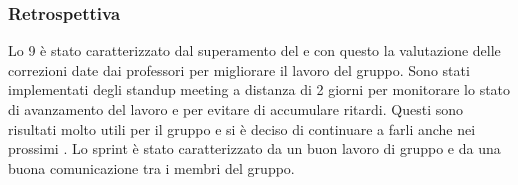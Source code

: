 \subsubsection{Retrospettiva}
\label{sec:retrospettiva_sprint9}
Lo  9 è stato caratterizzato dal superamento del  e con questo la valutazione delle correzioni date dai professori per migliorare il lavoro del gruppo.
Sono stati implementati degli standup meeting a distanza di 2 giorni per monitorare lo stato di avanzamento del lavoro e per evitare di accumulare ritardi.
Questi sono risultati molto utili per il gruppo e si è deciso di continuare a farli anche nei prossimi .
Lo sprint è stato caratterizzato da un buon lavoro di gruppo e da una buona comunicazione tra i membri del gruppo.